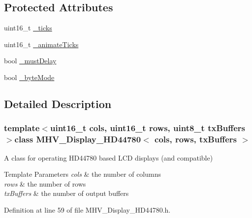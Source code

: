 \subsection*{Protected Attributes}
\begin{DoxyCompactItemize}
\item 
uint16\-\_\-t \hyperlink{class_m_h_v___display___h_d44780_a447c8849122f3533367daf1b105cf9c1}{\-\_\-ticks}
\item 
uint16\-\_\-t \hyperlink{class_m_h_v___display___h_d44780_aa744690f2e7185df1210f05920fec401}{\-\_\-animate\-Ticks}
\item 
bool \hyperlink{class_m_h_v___display___h_d44780_aa66775cef2a2fc7827427019fbbd4b7e}{\-\_\-must\-Delay}
\item 
bool \hyperlink{class_m_h_v___display___h_d44780_af41447745210bb900846ee6cd41b0818}{\-\_\-byte\-Mode}
\end{DoxyCompactItemize}


\subsection{Detailed Description}
\subsubsection*{template$<$uint16\-\_\-t cols, uint16\-\_\-t rows, uint8\-\_\-t tx\-Buffers$>$class M\-H\-V\-\_\-\-Display\-\_\-\-H\-D44780$<$ cols, rows, tx\-Buffers $>$}

A class for operating H\-D44780 based L\-C\-D displays (and compatible) 
\begin{DoxyTemplParams}{Template Parameters}
{\em cols} & the number of columns \\
\hline
{\em rows} & the number of rows \\
\hline
{\em tx\-Buffers} & the number of output buffers \\
\hline
\end{DoxyTemplParams}


Definition at line 59 of file M\-H\-V\-\_\-\-Display\-\_\-\-H\-D44780.\-h.



